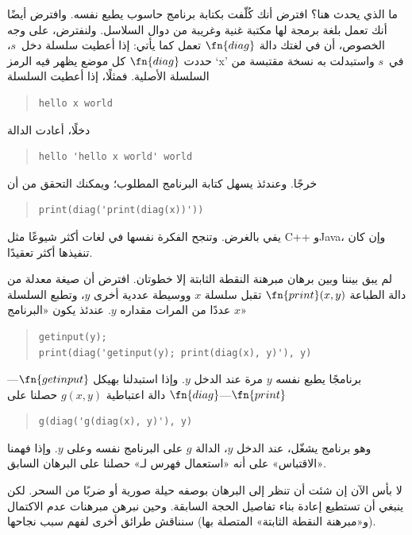 \documentclass[../../../include/open-logic-section]{subfiles}
\begin{document}
\begin{explain}
ما الذي يحدث هنا؟ افترض أنك كُلّفت بكتابة برنامج حاسوب يطبع نفسه.
وافترض أيضًا أنك تعمل بلغة برمجة لها مكتبة غنية وغريبة من دوال
السلاسل. ولنفترض، على وجه الخصوص، أن في لغتك دالة $\fn{diag}$ تعمل
كما يأتي: إذا أعطيت سلسلة دخل~$s$، حددت $\fn{diag}$ كل موضع يظهر فيه
الرمز `x' في~$s$ واستبدلت به نسخة مقتبسة من السلسلة الأصلية. فمثلًا،
إذا أعطيت السلسلة
\begin{quote}
\begin{verbatim}
hello x world
\end{verbatim}
\end{quote}
دخلًا، أعادت الدالة
\begin{quote}
\begin{verbatim}
hello 'hello x world' world
\end{verbatim}
\end{quote}
خرجًا. وعندئذ يسهل كتابة البرنامج المطلوب؛ ويمكنك التحقق من أن
\begin{quote}
\begin{verbatim}
print(diag('print(diag(x))'))
\end{verbatim}
\end{quote}
يفي بالغرض. وتنجح الفكرة نفسها في لغات أكثر شيوعًا مثل C++ وJava،
وإن كان تنفيذها أكثر تعقيدًا.

لم يبق بيننا وبين برهان مبرهنة النقطة الثابتة إلا خطوتان. افترض أن
صيغة معدلة من دالة الطباعة $\fn{print}(x,y)$ تقبل سلسلة $x$ ووسيطة
عددية أخرى $y$، وتطبع السلسلة $x$ عددًا من المرات مقداره $y$.
عندئذ يكون «البرنامج»
\begin{quote}
\begin{verbatim}
getinput(y);
print(diag('getinput(y); print(diag(x), y)'), y)
\end{verbatim}
\end{quote}
برنامجًا يطبع نفسه $y$ مرة عند الدخل $y$. وإذا استبدلنا بهيكل
$\fn{getinput}$---$\fn{print}$---$\fn{diag}$ دالة اعتباطية
$g(x,y)$ حصلنا على
\begin{quote}
\begin{verbatim}
g(diag('g(diag(x), y)'), y)
\end{verbatim}
\end{quote}
وهو برنامج يشغّل، عند الدخل $y$، الدالة $g$ على البرنامج نفسه وعلى
$y$. وإذا فهمنا «الاقتباس» على أنه «استعمال فهرس لـ» حصلنا على
البرهان السابق.

لا بأس الآن إن شئت أن تنظر إلى البرهان بوصفه حيلة صورية أو ضربًا من
السحر. لكن ينبغي أن تستطيع إعادة بناء تفاصيل الحجة السابقة. وحين
نبرهن مبرهنات عدم الاكتمال (و«مبرهنة النقطة الثابتة» المتصلة بها)
سنناقش طرائق أخرى لفهم سبب نجاحها.
\end{explain}
\end{document}
